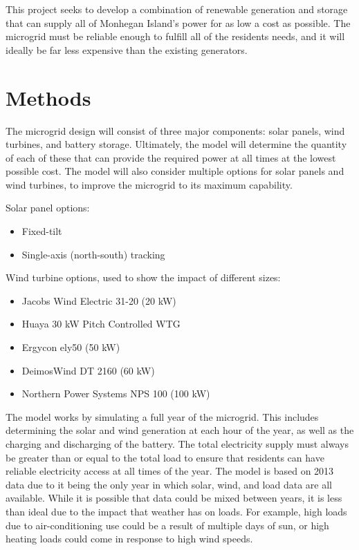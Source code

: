\documentclass{article}
\begin{document}
This project seeks to develop a combination of renewable generation and storage that can supply all of Monhegan Island's power for as low a cost as possible.  The microgrid must be reliable enough to fulfill all of the residents needs, and it will ideally be far less expensive than the existing generators.

\section{Methods}

The microgrid design will consist of three major components: solar panels, wind turbines, and battery storage.  Ultimately, the model will determine the quantity of each of these that can provide the required power at all times at the lowest possible cost.  The model will also consider multiple options for solar panels and wind turbines, to improve the microgrid to its maximum capability.

Solar panel options:
\begin{itemize}
\item{Fixed-tilt}
\item{Single-axis (north-south) tracking}
\end{itemize}

Wind turbine options, used to show the impact of different sizes:
\begin{itemize}
\item Jacobs Wind Electric 31-20 (20 kW) \cite{20kW}
\item Huaya 30 kW Pitch Controlled WTG \cite{30kW}
\item Ergycon ely50 (50 kW) \cite{50kW}
\item DeimosWind DT 2160 (60 kW) \cite{60kW}
\item Northern Power Systems NPS 100 (100 kW) \cite{100kW}
\end{itemize}

The model works by simulating a full year of the microgrid.  This includes determining the solar and wind generation at each hour of the year, as well as the charging and discharging of the battery.  The total electricity supply must always be greater than or equal to the total load to ensure that residents can have reliable electricity access at all times of the year.  The model is based on 2013 data due to it being the only year in which solar, wind, and load data are all available.  While it is possible that data could be mixed between years, it is less than ideal due to the impact that weather has on loads.  For example, high loads due to air-conditioning use could be a result of multiple days of sun, or high heating loads could come in response to high wind speeds.
\end{document}
